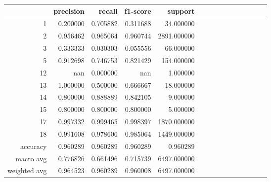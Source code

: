 \begin{table}[h]
\centering
\label{table:5}
\begin{tabular}{rrrrrrrrrrrrrrr}
\toprule
 & precision & recall & f1-score & support \\
\midrule
1 & 0.200000 & 0.705882 & 0.311688 & 34.000000 \\
2 & 0.956462 & 0.965064 & 0.960744 & 2891.000000 \\
3 & 0.333333 & 0.030303 & 0.055556 & 66.000000 \\
5 & 0.912698 & 0.746753 & 0.821429 & 154.000000 \\
12 & nan & 0.000000 & nan & 1.000000 \\
13 & 1.000000 & 0.500000 & 0.666667 & 18.000000 \\
14 & 0.800000 & 0.888889 & 0.842105 & 9.000000 \\
15 & 0.800000 & 0.800000 & 0.800000 & 5.000000 \\
17 & 0.997332 & 0.999465 & 0.998397 & 1870.000000 \\
18 & 0.991608 & 0.978606 & 0.985064 & 1449.000000 \\
accuracy & 0.960289 & 0.960289 & 0.960289 & 0.960289 \\
macro avg & 0.776826 & 0.661496 & 0.715739 & 6497.000000 \\
weighted avg & 0.964523 & 0.960289 & 0.960008 & 6497.000000 \\
\bottomrule
\end{tabular}
\end{table}
